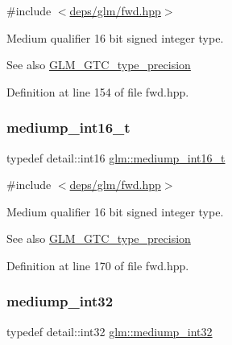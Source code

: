 {\ttfamily \#include $<$\hyperlink{fwd_8hpp}{deps/glm/fwd.\+hpp}$>$}

Medium qualifier 16 bit signed integer type. \begin{DoxySeeAlso}{See also}
\hyperlink{group__gtc__type__precision}{G\+L\+M\+\_\+\+G\+T\+C\+\_\+type\+\_\+precision} 
\end{DoxySeeAlso}


Definition at line 154 of file fwd.\+hpp.

\mbox{\label{group__gtc__type__precision_ga478fab608cf43040013d719a3e03b194}} 
\subsubsection{\texorpdfstring{mediump\+\_\+int16\+\_\+t}{mediump\_int16\_t}}
{\footnotesize\ttfamily typedef detail\+::int16 \hyperlink{group__gtc__type__precision_ga478fab608cf43040013d719a3e03b194}{glm\+::mediump\+\_\+int16\+\_\+t}}



{\ttfamily \#include $<$\hyperlink{fwd_8hpp}{deps/glm/fwd.\+hpp}$>$}

Medium qualifier 16 bit signed integer type. \begin{DoxySeeAlso}{See also}
\hyperlink{group__gtc__type__precision}{G\+L\+M\+\_\+\+G\+T\+C\+\_\+type\+\_\+precision} 
\end{DoxySeeAlso}


Definition at line 170 of file fwd.\+hpp.

\mbox{\label{group__gtc__type__precision_ga0660a752402702f420f13c686a7fff29}} 
\subsubsection{\texorpdfstring{mediump\+\_\+int32}{mediump\_int32}}
{\footnotesize\ttfamily typedef detail\+::int32 \hyperlink{group__gtc__type__precision_ga0660a752402702f420f13c686a7fff29}{glm\+::mediump\+\_\+int32}}




